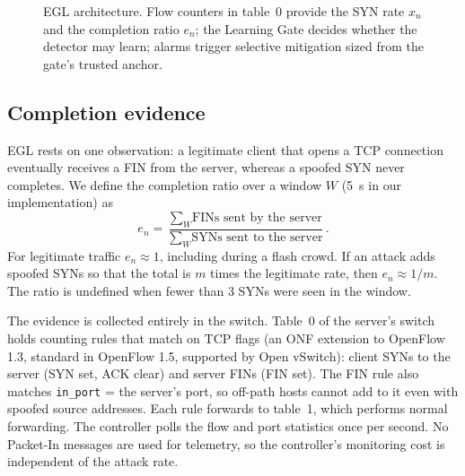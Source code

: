 \documentclass[conference]{IEEEtran}
\begin{document}
\begin{figure}[t]
\caption{EGL architecture. Flow counters in table~0 provide the SYN rate $x_n$ and the completion ratio $e_n$; the Learning Gate decides whether the detector may learn; alarms trigger selective mitigation sized from the gate's trusted anchor.}
\label{fig:arch}
\end{figure}

\subsection{Completion evidence}
EGL rests on one observation: a legitimate client that opens a TCP connection eventually receives a FIN from the server, whereas a spoofed SYN never completes. We define the completion ratio over a window $W$ (5~s in our implementation) as
\begin{equation}
e_n = \frac{\sum_{W} \text{FINs sent by the server}}{\sum_{W} \text{SYNs sent to the server}} . \label{eq:completion}
\end{equation}
For legitimate traffic $e_n \approx 1$, including during a flash crowd. If an attack adds spoofed SYNs so that the total is $m$ times the legitimate rate, then $e_n \approx 1/m$. The ratio is undefined when fewer than 3 SYNs were seen in the window.

The evidence is collected entirely in the switch. Table~0 of the server's switch holds counting rules that match on TCP flags (an ONF extension to OpenFlow 1.3, standard in OpenFlow 1.5, supported by Open vSwitch): client SYNs to the server (SYN set, ACK clear) and server FINs (FIN set). The FIN rule also matches \texttt{in\_port} = the server's port, so off-path hosts cannot add to it even with spoofed source addresses. Each rule forwards to table~1, which performs normal forwarding. The controller polls the flow and port statistics once per second. No Packet-In messages are used for telemetry, so the controller's monitoring cost is independent of the attack rate.
\end{document}
